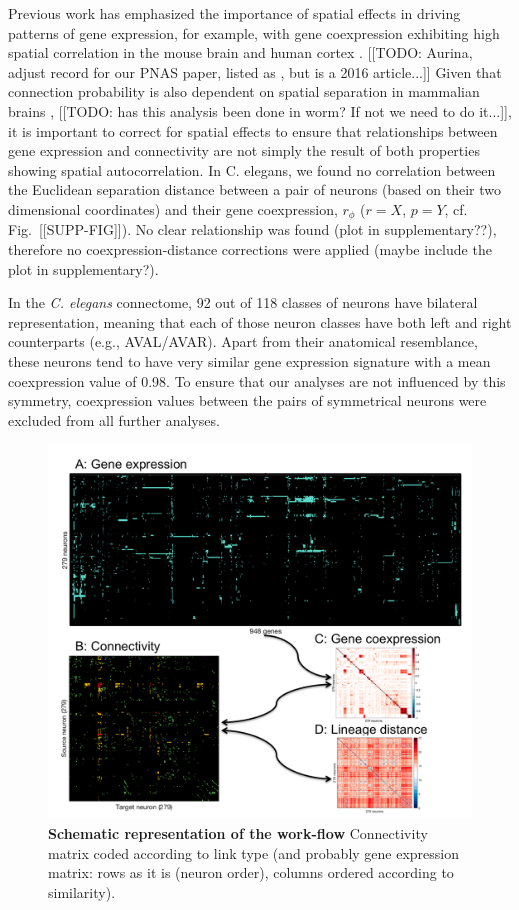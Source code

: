 \documentclass[10pt,letterpaper]{article}
\begin{document}
Previous work has emphasized the importance of spatial effects in driving patterns of gene expression, for example, with gene coexpression exhibiting high spatial correlation in the mouse brain \cite{Fulcher:2016ck} and human cortex \cite{Pantazatos:2016ir}.
[[TODO: Aurina, adjust record for our PNAS paper, listed as , but is a 2016 article...]]
Given that connection probability is also dependent on spatial separation in mammalian brains \cite{Henderson:2014fg, Horvat:2016ia}, [[TODO: has this analysis been done in worm? If not we need to do it...]], it is important to correct for spatial effects to ensure that relationships between gene expression and connectivity are not simply the result of both properties showing spatial autocorrelation.
In C. elegans, we found no correlation between the Euclidean separation distance between a pair of neurons (based on their two dimensional coordinates) and their gene coexpression, $r_\phi$ ($r = X$, $p = Y$, cf. Fig.~[[SUPP-FIG]]).
No clear relationship was found (plot in supplementary??), therefore no coexpression-distance corrections were applied (maybe include the plot in supplementary?).

In the \emph{C. elegans} connectome, 92 out of 118 classes of neurons have bilateral representation, meaning that each of those neuron classes have both left and right counterparts (e.g., AVAL/AVAR).
Apart from their anatomical resemblance, these neurons tend to have very similar gene expression signature with a mean coexpression value of 0.98.
To ensure that our analyses are not influenced by this symmetry, coexpression values between the pairs of symmetrical neurons were excluded from all further analyses.
 \begin{figure}[!ht]
  \centering
    \includegraphics[width=1\textwidth]{SchematicDATA}
 \caption{{\bf Schematic representation of the work-flow}
Connectivity matrix coded according to link type (and probably gene expression matrix: rows as it is (neuron order), columns ordered according to similarity).}
 \label{fig:SchematicRepresentation}
 \end{figure}
\end{document}
